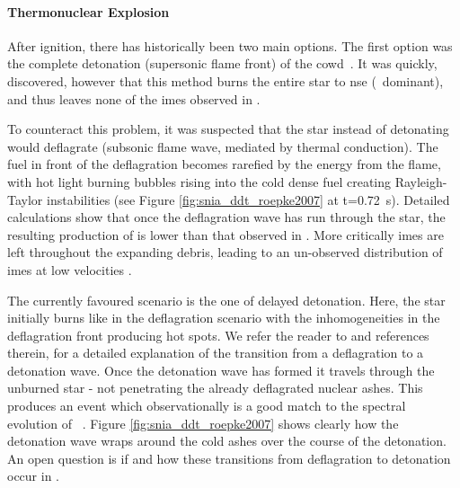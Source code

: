 \paragraph{Thermonuclear Explosion} After ignition, there has historically been two main options. The first option was the complete detonation (supersonic flame front) of the \gls{cowd}\ \citep{1969Ap&SS...5..180A}. It was quickly, discovered, however that this method burns the entire star to \gls{nse} (\Ni\ dominant),  and thus leaves none of the \glspl{ime} observed in \sneia. 

To counteract this problem, it was suspected that the star instead of detonating would deflagrate (subsonic flame wave, mediated by thermal conduction). The fuel in front of the deflagration becomes rarefied by the energy from the flame, with hot light burning bubbles rising into the cold dense fuel creating Rayleigh-Taylor instabilities (see Figure \ref{fig:snia_ddt_roepke2007} at t=0.72~s). 
Detailed calculations show that once the deflagration wave has run through the star, the resulting production of \Ni[56] is lower than that observed in \sneia. More critically \glspl{ime} are left throughout the expanding debris, leading to an un-observed distribution of \glspl{ime} at low velocities \citep{2007Sci...315..825M}.

The currently favoured scenario is the one of delayed detonation. Here, the star initially burns like in the deflagration scenario with the inhomogeneities in the deflagration front producing hot spots. We refer the reader to \citet{2010ApJ...710.1683S} and references therein, for a detailed explanation of the transition from a deflagration to a detonation wave. Once the detonation wave has formed it travels through the unburned star - not penetrating the already deflagrated nuclear ashes. This produces an event which observationally is a good match to the spectral evolution of \sneia\ \citep[e.g.][]{2009Natur.460..869K}. Figure \ref{fig:snia_ddt_roepke2007} shows clearly how the detonation wave wraps around the cold ashes over the course of the detonation. An open question is if and how these transitions from deflagration to detonation occur in \sneia.


